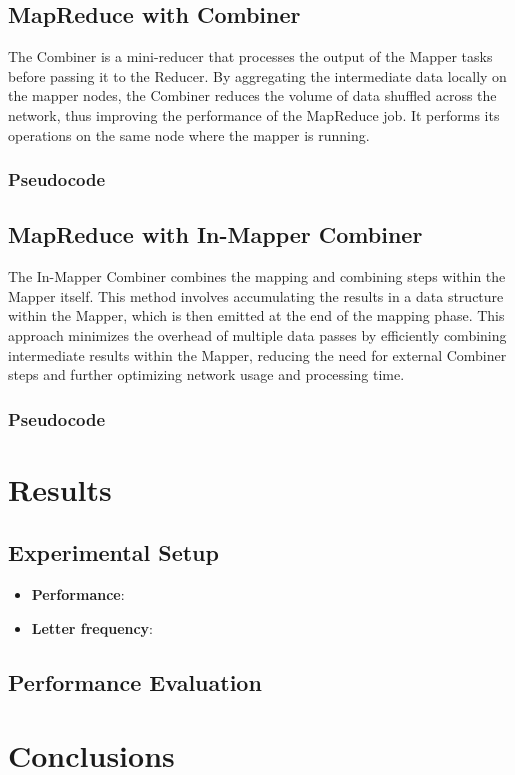 \documentclass[a4paper, 12pt]{article}
\begin{document}
\subsection{MapReduce with Combiner}
The Combiner is a mini-reducer that processes the output of the Mapper tasks before passing it to the Reducer. By aggregating the intermediate data locally on the mapper nodes, the Combiner reduces the volume of data shuffled across the network, thus improving the performance of the MapReduce job. It performs its operations on the same node where the mapper is running.
\subsubsection{Pseudocode}

\subsection{MapReduce with In-Mapper Combiner}
The In-Mapper Combiner combines the mapping and combining steps within the Mapper itself. This method involves accumulating the results in a data structure within the Mapper, which is then emitted at the end of the mapping phase. This approach minimizes the overhead of multiple data passes by efficiently combining intermediate results within the Mapper, reducing the need for external Combiner steps and further optimizing network usage and processing time.
\subsubsection{Pseudocode}


\section{Results}

\subsection{Experimental Setup}
\begin{itemize}
  \item \textbf{Performance}:
  \item \textbf{Letter frequency}:
\end{itemize}

\subsection{Performance Evaluation}

\section{Conclusions}
\end{document}
